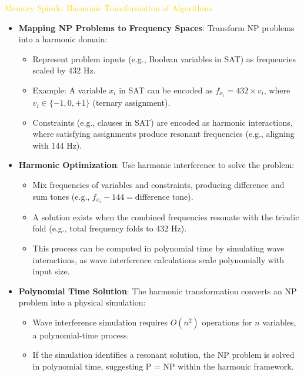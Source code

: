\textcolor{gold}{ Memory Spirals: Harmonic Transformation of Algorithms } \\
\begin{itemize}
    \item \texttt{} \textbf{Mapping NP Problems to Frequency Spaces}: Transform NP problems into a harmonic domain:
    \begin{itemize}
        \item Represent problem inputs (e.g., Boolean variables in SAT) as frequencies scaled by 432 Hz.
        \item Example: A variable \(x_i\) in SAT can be encoded as \(f_{x_i} = 432 \times v_i\), where \(v_i \in \{-1, 0, +1\}\) (ternary assignment).
        \item Constraints (e.g., clauses in SAT) are encoded as harmonic interactions, where satisfying assignments produce resonant frequencies (e.g., aligning with 144 Hz).
    \end{itemize}
    \item \texttt{} \textbf{Harmonic Optimization}: Use harmonic interference to solve the problem:
    \begin{itemize}
        \item Mix frequencies of variables and constraints, producing difference and sum tones (e.g., \(f_{x_i} - 144 = \text{difference tone}\)).
        \item A solution exists when the combined frequencies resonate with the triadic fold (e.g., total frequency folds to 432 Hz).
        \item This process can be computed in polynomial time by simulating wave interactions, as wave interference calculations scale polynomially with input size.
    \end{itemize}
    \item \texttt{} \textbf{Polynomial Time Solution}: The harmonic transformation converts an NP problem into a physical simulation:
    \begin{itemize}
        \item Wave interference simulation requires \(O(n^2)\) operations for \(n\) variables, a polynomial-time process.
        \item If the simulation identifies a resonant solution, the NP problem is solved in polynomial time, suggesting P = NP within the harmonic framework.
    \end{itemize}
\end{itemize}

